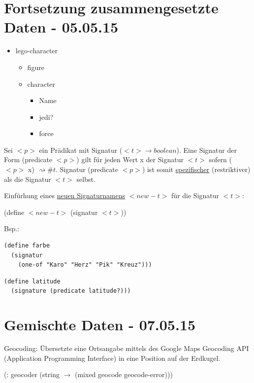 \documentclass[a4paper, 20pt, openany]{book}
\begin{document}
\chapter{Fortsetzung zusammengesetzte Daten - 05.05.15}

\begin{itemize}
  \item lego-character
    \begin{itemize}
      \item figure
      \item character
        \begin{itemize}
          \item Name
          \item jedi?
          \item force
        \end{itemize}
    \end{itemize}
\end{itemize}

Sei $<p>$ ein Prädikat mit Signatur ($<t> \rightarrow boolean$). Eine Signatur der Form (predicate $<p>$) gilt für jeden Wert x der Signatur $<t>$ sofern ($<p>$ x) $\rightsquigarrow \#t$.
Signatur (predicate $<p>$) ist somit \underline{spezifischer} (restriktiver) als die Signatur $<t>$ selbst. 

Einfürhung eines \underline{neuen Signaturnamens} $<new-t>$ für die Signatur $<t>$: 

\begin{center}
  (define $<new-t>$ (signatur $<t>$))
\end{center}

Bsp.: 

\begin{lstlisting}
(define farbe 
  (signatur 
    (one-of "Karo" "Herz" "Pik" "Kreuz")))
\end{lstlisting}

\begin{lstlisting}
(define latitude 
  (signature (predicate latitude?)))
\end{lstlisting}

\chapter{Gemischte Daten - 07.05.15}
Geocoding: Übersetzte eine Ortsangabe mittels des Google Maps Geocoding API (Application Programming Interface) in eine Position auf der Erdkugel.

\begin{center}
  (: geocoder (string $\rightarrow$ (mixed geocode geocode-error)))
\end{center}
\end{document}
